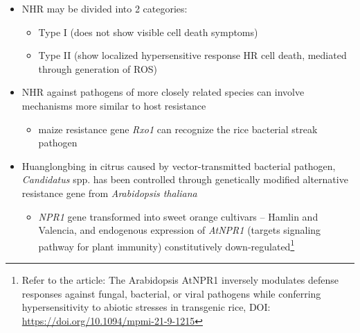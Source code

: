 \documentclass[11pt,dvipsnames,ignorenonframetext,aspectratio=169]{beamer}
\providecommand{\tightlist}{%
  \setlength{\itemsep}{0pt}\setlength{\parskip}{0pt}}
\begin{document}
\begin{frame}{}
\protect\hypertarget{section-3}{}
\small

\begin{itemize}
\tightlist
\item
  NHR may be divided into 2 categories:

  \begin{itemize}
  \footnotesize
  \item Type I (does not show visible cell death symptoms)
  \item Type II (show localized hypersensitive response HR cell death, mediated through generation of ROS)
  \end{itemize}
\item
  NHR against pathogens of more closely related species can involve
  mechanisms more similar to host resistance

  \begin{itemize}
  \footnotesize
  \item maize resistance gene \textit{Rxo1} can recognize the rice bacterial streak pathogen
  \end{itemize}
\item
  Huanglongbing in citrus caused by vector-transmitted bacterial
  pathogen, \emph{Candidatus} spp. has been controlled through
  genetically modified alternative resistance gene from
  \emph{Arabidopsis thaliana}

  \begin{itemize}
  \scriptsize
  \item \textit{NPR1} gene transformed into sweet orange cultivars -- Hamlin and Valencia, and endogenous expression of \textit{AtNPR1} (targets signaling pathway for plant immunity) constitutively down-regulated\footnote[frame]{\scriptsize Refer to the article: The Arabidopsis AtNPR1 inversely modulates defense responses against fungal, bacterial, or viral pathogens while conferring hypersensitivity to abiotic stresses in transgenic rice, DOI: \url{https://doi.org/10.1094/mpmi-21-9-1215}}
  \end{itemize}
\end{itemize}
\end{frame}
\end{document}
